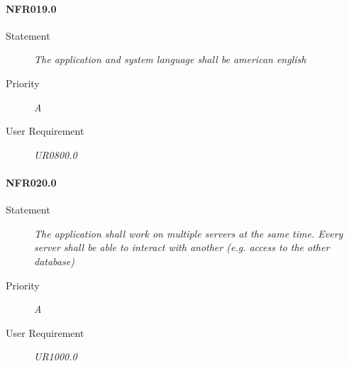 \paragraph{NFR019.0}
\begin{description}
\item [Statement] \textit{
The application and system language shall be american english
}
\item [Priority] \textit{A}
\item[User Requirement] \textit{UR0800.0}
\end{description}

\paragraph{NFR020.0}
\begin{description}
\item [Statement] \textit{
The application shall work on multiple servers at the same time. Every server shall be able to interact with another (e.g. access to the other database)
}
\item [Priority] \textit{A}
\item[User Requirement] \textit{UR1000.0}
\end{description}
